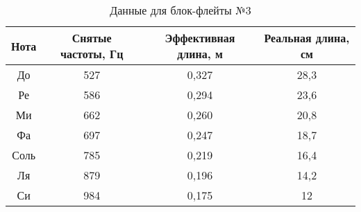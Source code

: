 \begin{table}[!ht]
    \centering
    \begin{tabular}{|c|c|c|c|}
    \hline
    Нота & Снятые частоты, Гц & Эффективная длина, м & Реальная длина, см \\ \hline
    До   & 527                & 0,327                & 28,3               \\ \hline
    Ре   & 586                & 0,294                & 23,6               \\ \hline
    Ми   & 662                & 0,260                & 20,8               \\ \hline
    Фа   & 697                & 0,247                & 18,7               \\ \hline
    Соль & 785                & 0,219                & 16,4               \\ \hline
    Ля   & 879                & 0,196                & 14,2               \\ \hline
    Си   & 984                & 0,175                & 12                 \\ \hline
    \end{tabular}
    \caption{Данные для блок-флейты №3}
    \label{tab:dannie_dla_blok_fleita_3}
\end{table}

